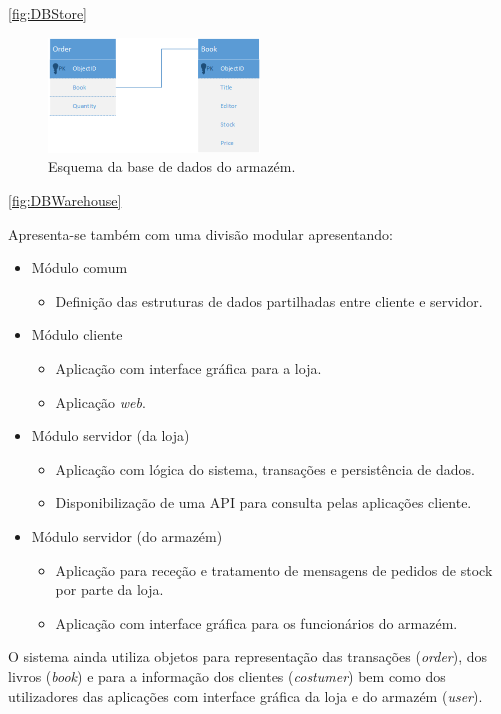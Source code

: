 \documentclass[12pt]{article}
\begin{document}
\ref{fig:DBStore}

\begin{figure}[h!]
    \centering
    \includegraphics[width=0.5\textwidth]{DBWarehouse.png}
    \caption{Esquema da base de dados do armazém.}
    \label{fig:arch}
\end{figure}

\ref{fig:DBWarehouse}

\newpage

Apresenta-se também com uma divisão modular apresentando:
\begin{itemize}
\item Módulo comum
\begin{itemize}
\item Definição das estruturas de dados partilhadas entre cliente e servidor.
\end{itemize}
\item Módulo cliente
\begin{itemize}
\item Aplicação com interface gráfica para a loja.
\item Aplicação \textit{web}.
\end{itemize}
\item Módulo servidor (da loja)
\begin{itemize}
\item Aplicação com lógica do sistema, transações e persistência de dados.
\item Disponibilização de uma API para consulta pelas aplicações cliente.
\end{itemize}
\item Módulo servidor (do armazém)
\begin{itemize}
\item Aplicação  para receção e tratamento de mensagens de pedidos de stock por parte da loja.
\item Aplicação com interface gráfica para os funcionários do armazém.
\end{itemize}
\end{itemize}

O sistema ainda utiliza objetos para representação das transações (\textit{order}), dos livros (\textit{book}) e para a informação dos clientes (\textit{costumer}) bem como dos utilizadores das aplicações com interface gráfica da loja e do armazém (\textit{user}).
\end{document}
